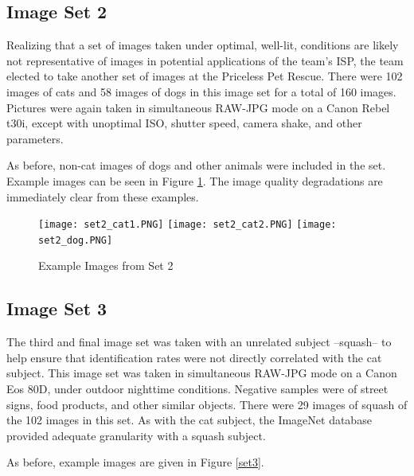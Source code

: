 \documentclass{report}
\begin{document}
\subsection{Image Set 2}

Realizing that a set of images taken under optimal, well-lit, conditions are likely not representative of images in potential applications of the team's ISP, the team elected to take another set of images at the Priceless Pet Rescue. There were 102 images of cats and 58 images of dogs in this image set for a total of 160 images. Pictures were again taken in simultaneous RAW-JPG mode on a Canon Rebel t30i, except with unoptimal ISO, shutter speed, camera shake, and other parameters.

As before, non-cat images of dogs and other animals were included in the set. Example images can be seen in Figure \ref{set2}. The image quality degradations are immediately clear from these examples.

\begin{figure}[!htb]
	\begin{center}
		\caption{Example Images from Set 2}
		\label{set2}
		\texttt{[image: set2\_cat1.PNG]}
		\texttt{[image: set2\_cat2.PNG]}
		\texttt{[image: set2\_dog.PNG]}
	\end{center}
\end{figure}		

\subsection{Image Set 3}
The third and final image set was taken with an unrelated subject --squash-- to help ensure that identification rates were not directly correlated with the cat subject. This image set was taken in simultaneous RAW-JPG mode on a Canon Eos 80D, under outdoor nighttime conditions. Negative samples were of street signs, food products, and other similar objects. There were 29 images of squash of the 102 images in this set. As with the cat subject, the ImageNet database provided adequate granularity with a squash subject.

As before, example images are given in Figure \ref{set3}.
\end{document}
